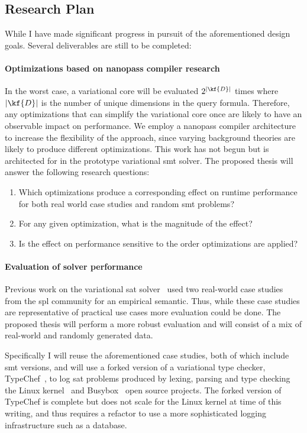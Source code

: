 \subsection{Research Plan}
While I have made significant progress in pursuit of the aforementioned design
goals. Several deliverables are still to be completed:

\paragraph{Optimizations based on nanopass compiler research} In the worst case,
a variational core will be evaluated $2^{|\kf{D}|}$ times where $|\kf{D}|$ is
the number of unique dimensions in the query formula. Therefore, any
optimizations that can simplify the variational core once are likely to have an
observable impact on performance. We employ a nanopass compiler architecture to
increase the flexibility of the approach, since varying background theories are
likely to produce different optimizations. This work has not begun but is
architected for in the prototype variational \ac{smt} solver. The proposed
thesis will answer the following research questions:
\begin{enumerate}
\item Which optimizations produce a corresponding effect on runtime performance
  for both real world case studies and random \ac{smt} problems?
\item For any given optimization, what is the magnitude
  of the effect?
\item Is the effect on performance sensitive to the order optimizations are
  applied?
\end{enumerate}

\paragraph{Evaluation of solver performance}
Previous work on the variational \ac{sat} solver~\cite{10.1145/3382025.3414965}
used two real-world case studies~\cite{MNS+:SPLC17} from the \ac{spl} community
for an empirical semantic. Thus, while these case studies are representative of
practical use cases more evaluation could be done. The proposed thesis will
perform a more robust evaluation and will consist of a mix of real-world and
randomly generated data.

Specifically I will reuse the aforementioned case studies, both of which include
\ac{smt} versions, and will use a forked version of a variational type checker,
TypeChef~\cite{KKHL:FOSD10}, to log \ac{sat} problems produced by lexing,
parsing and type checking the Linux kernel~\cite{linux} and
Busybox~\cite{busybox} open source projects. The forked version of TypeChef is
complete but does not scale for the Linux kernel at time of this writing, and
thus requires a refactor to use a more sophisticated logging infrastructure such
as a database.

